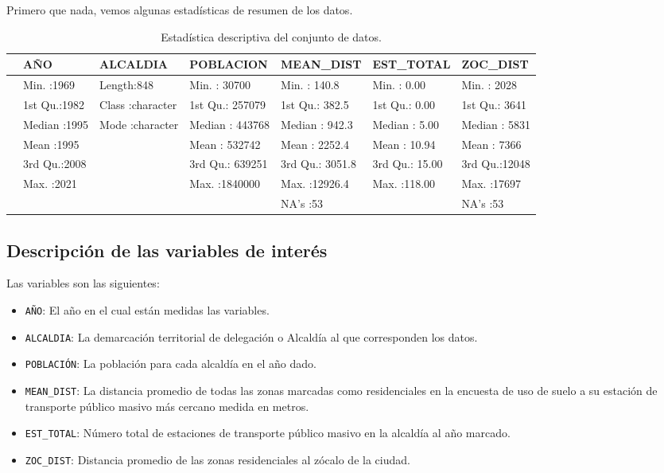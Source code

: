 \documentclass[
  spanish,
]{article}
\providecommand{\tightlist}{%
  \setlength{\itemsep}{0pt}\setlength{\parskip}{0pt}}
\begin{document}
Primero que nada, vemos algunas estadísticas de resumen de los datos.

\begin{table}

\caption{\label{tab:unnamed-chunk-4}Estadística descriptiva del conjunto de datos.}
\centering
\begin{tabular}[t]{lllllll}
\toprule
  &      AÑO &   ALCALDIA &   POBLACION &   MEAN\_DIST &   EST\_TOTAL &    ZOC\_DIST\\
\midrule
 & Min.   :1969 & Length:848 & Min.   :  30700 & Min.   :  140.8 & Min.   :  0.00 & Min.   : 2028\\
 & 1st Qu.:1982 & Class :character & 1st Qu.: 257079 & 1st Qu.:  382.5 & 1st Qu.:  0.00 & 1st Qu.: 3641\\
 & Median :1995 & Mode  :character & Median : 443768 & Median :  942.3 & Median :  5.00 & Median : 5831\\
 & Mean   :1995 &  & Mean   : 532742 & Mean   : 2252.4 & Mean   : 10.94 & Mean   : 7366\\
 & 3rd Qu.:2008 &  & 3rd Qu.: 639251 & 3rd Qu.: 3051.8 & 3rd Qu.: 15.00 & 3rd Qu.:12048\\
 & Max.   :2021 &  & Max.   :1840000 & Max.   :12926.4 & Max.   :118.00 & Max.   :17697\\
 &  &  &  & NA's   :53 &  & NA's   :53\\
\bottomrule
\end{tabular}
\end{table}

\hypertarget{descripciuxf3n-de-las-variables-de-interuxe9s}{%
\subsection{Descripción de las variables de
interés}\label{descripciuxf3n-de-las-variables-de-interuxe9s}}

Las variables son las siguientes:

\begin{itemize}
\tightlist
\item
  \texttt{AÑO}: El año en el cual están medidas las variables.
\item
  \texttt{ALCALDIA}: La demarcación territorial de delegación o Alcaldía
  al que corresponden los datos.
\item
  \texttt{POBLACIÓN}: La población para cada alcaldía en el año dado.
\item
  \texttt{MEAN\_DIST}: La distancia promedio de todas las zonas marcadas
  como residenciales en la encuesta de uso de suelo a su estación de
  transporte público masivo más cercano medida en metros.
\item
  \texttt{EST\_TOTAL}: Número total de estaciones de transporte público
  masivo en la alcaldía al año marcado.
\item
  \texttt{ZOC\_DIST}: Distancia promedio de las zonas residenciales al
  zócalo de la ciudad.
\end{itemize}
\end{document}
